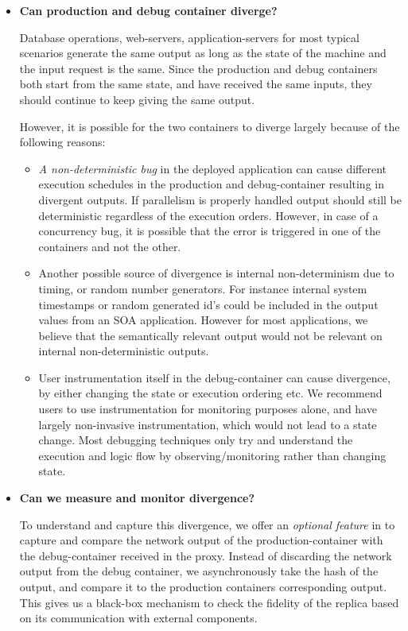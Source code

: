 \begin{itemize}
	\item \textbf{Can production and debug container diverge?}
	
	Database operations, web-servers, application-servers for most typical scenarios generate the same output as long as the state of the machine and the input request is the same. 
	Since the production and debug containers both start from the same state, and have received the same inputs, they should continue to keep giving the same output.
	
	However, it is possible for the two containers to diverge largely because of the following reasons:
	\begin{itemize}
		\item \emph{A non-deterministic bug} in the deployed application can cause different execution schedules in the production and debug-container resulting in divergent outputs. 
		If parallelism is properly handled output should still be deterministic regardless of the execution orders.
		However, in case of a concurrency bug, it is possible that the error is triggered in one of the containers and not the other.
		\item Another possible source of divergence is internal non-determinism due to timing, or random number generators. 
		For instance internal system timestamps or random generated id's could be included in the output values from an SOA application. However for most applications, we believe that the semantically relevant output would not be relevant on internal non-deterministic outputs.
		\item User instrumentation itself in the debug-container can cause divergence, by either changing the state or execution ordering etc. We recommend \parikshan users to use instrumentation for monitoring purposes alone, and have largely non-invasive instrumentation, which would not lead to a state change.
		Most debugging techniques only try and understand the execution and logic flow by observing/monitoring rather than changing state.
	\end{itemize}
	
	\item \textbf{Can we measure and monitor divergence?}
	
	To understand and capture this divergence, we offer an \emph{optional feature} in \parikshan to capture and compare the network output  of the production-container with the debug-container received in the proxy.
	Instead of discarding the network output from the debug container, we asynchronously take the hash of the output, and compare it to the production containers corresponding output.
	This gives us a black-box mechanism to check the fidelity of the replica based on its communication with external components.
	

\end{itemize}
